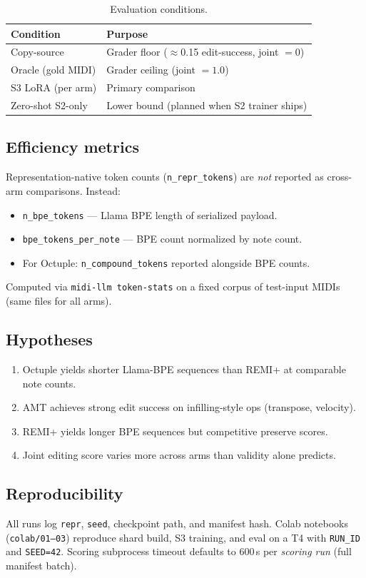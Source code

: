 \begin{table}[h]
\centering
\small
\begin{tabular}{@{}ll@{}}
\toprule
\textbf{Condition} & \textbf{Purpose} \\
\midrule
Copy-source & Grader floor ($\approx$0.15 edit-success, joint $=0$) \\
Oracle (gold MIDI) & Grader ceiling (joint $=1.0$) \\
S3 LoRA (per arm) & Primary comparison \\
Zero-shot S2-only & Lower bound (planned when S2 trainer ships) \\
\bottomrule
\end{tabular}
\caption{Evaluation conditions.}
\label{tab:conditions}
\end{table}

\subsection{Efficiency metrics}

Representation-native token counts (\texttt{n\_repr\_tokens}) are \emph{not} reported as cross-arm comparisons. Instead:

\begin{itemize}[leftmargin=*]
\item \texttt{n\_bpe\_tokens} --- Llama BPE length of serialized payload.
\item \texttt{bpe\_tokens\_per\_note} --- BPE count normalized by note count.
\item For Octuple: \texttt{n\_compound\_tokens} reported alongside BPE counts.
\end{itemize}

Computed via \texttt{midi-llm token-stats} on a fixed corpus of test-input MIDIs (same files for all arms).

\subsection{Hypotheses}

\begin{enumerate}[leftmargin=*]
\item[H1] Octuple yields shorter Llama-BPE sequences than REMI+ at comparable note counts.
\item[H2] AMT achieves strong edit success on infilling-style ops (transpose, velocity).
\item[H3] REMI+ yields longer BPE sequences but competitive preserve scores.
\item[H4] Joint editing score varies more across arms than validity alone predicts.
\end{enumerate}

\subsection{Reproducibility}

All runs log \texttt{repr}, \texttt{seed}, checkpoint path, and manifest hash. Colab notebooks (\texttt{colab/01--03}) reproduce shard build, S3 training, and eval on a T4 with \texttt{RUN\_ID} and \texttt{SEED=42}. Scoring subprocess timeout defaults to 600\,s per \emph{scoring run} (full manifest batch).
